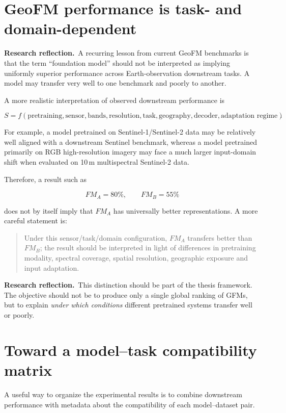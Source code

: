 \documentclass[11pt,a4paper]{article}
\newcommand{\reflection}{\textcolor{reflectionorange}{\textbf{Research reflection.}}}
\begin{document}
\section{GeoFM performance is task- and domain-dependent}

\reflection\ A recurring lesson from current GeoFM benchmarks is that the term
``foundation model'' should not be interpreted as implying uniformly superior performance
across Earth-observation downstream tasks. A model may transfer very well to one benchmark
and poorly to another.

A more realistic interpretation of observed downstream performance is

\[
S =
f(
\text{pretraining},
\text{sensor},
\text{bands},
\text{resolution},
\text{task},
\text{geography},
\text{decoder},
\text{adaptation regime}
).
\]

For example, a model pretrained on Sentinel-1/Sentinel-2 data may be relatively well aligned
with a downstream Sentinel benchmark, whereas a model pretrained primarily on RGB
high-resolution imagery may face a much larger input-domain shift when evaluated on
10\,m multispectral Sentinel-2 data.

Therefore, a result such as

\[
FM_A=80\%,\qquad FM_B=55\%
\]

does not by itself imply that \(FM_A\) has universally better representations. A more careful
statement is:

\begin{quote}
Under this sensor/task/domain configuration, \(FM_A\) transfers better than \(FM_B\); the
result should be interpreted in light of differences in pretraining modality, spectral
coverage, spatial resolution, geographic exposure and input adaptation.
\end{quote}

\reflection\ This distinction should be part of the thesis framework. The objective should
not be to produce only a single global ranking of GFMs, but to explain \emph{under which
conditions} different pretrained systems transfer well or poorly.

\section{Toward a model--task compatibility matrix}

A useful way to organize the experimental results is to combine downstream performance with
metadata about the compatibility of each model--dataset pair.
\end{document}
